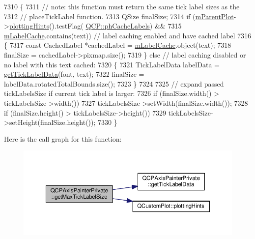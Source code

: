 \begin{DoxyCode}
7310                                                                              \{
7311   \textcolor{comment}{// note: this function must return the same tick label sizes as the}
7312   \textcolor{comment}{// placeTickLabel function.}
7313   QSize finalSize;
7314   \textcolor{keywordflow}{if} (\hyperlink{class_q_c_p_axis_painter_private_a882029a5f2d4abd71289d415c9b90a28}{mParentPlot}->\hyperlink{class_q_custom_plot_a130b55e205697a5288081e9fc11e443e}{plottingHints}().testFlag(
      \hyperlink{namespace_q_c_p_a5400e5fcb9528d92002ddb938c1f4ef4a8e9cfe5ee0c5cd36dd7accf9739aff65}{QCP::phCacheLabels}) &&
7315       \hyperlink{class_q_c_p_axis_painter_private_a07ac270ea0c0ae084debd48d6a740e35}{mLabelCache}.contains(text)) \textcolor{comment}{// label caching enabled and have cached label}
7316   \{
7317     \textcolor{keyword}{const} CachedLabel *cachedLabel = \hyperlink{class_q_c_p_axis_painter_private_a07ac270ea0c0ae084debd48d6a740e35}{mLabelCache}.object(text);
7318     finalSize = cachedLabel->pixmap.size();
7319   \} \textcolor{keywordflow}{else} \textcolor{comment}{// label caching disabled or no label with this text cached:}
7320   \{
7321     TickLabelData labelData = \hyperlink{class_q_c_p_axis_painter_private_ad9f24fbcbf9d8c92b34d9d00b010e6a3}{getTickLabelData}(font, text);
7322     finalSize = labelData.rotatedTotalBounds.size();
7323   \}
7324 
7325   \textcolor{comment}{// expand passed tickLabelsSize if current tick label is larger:}
7326   \textcolor{keywordflow}{if} (finalSize.width() > tickLabelsSize->width())
7327     tickLabelsSize->setWidth(finalSize.width());
7328   \textcolor{keywordflow}{if} (finalSize.height() > tickLabelsSize->height())
7329     tickLabelsSize->setHeight(finalSize.height());
7330 \}
\end{DoxyCode}


Here is the call graph for this function\+:\nopagebreak
\begin{figure}[H]
\begin{center}
\leavevmode
\includegraphics[width=350pt]{class_q_c_p_axis_painter_private_a8a7c82303e272485621fde78a5b674f9_cgraph}
\end{center}
\end{figure}




